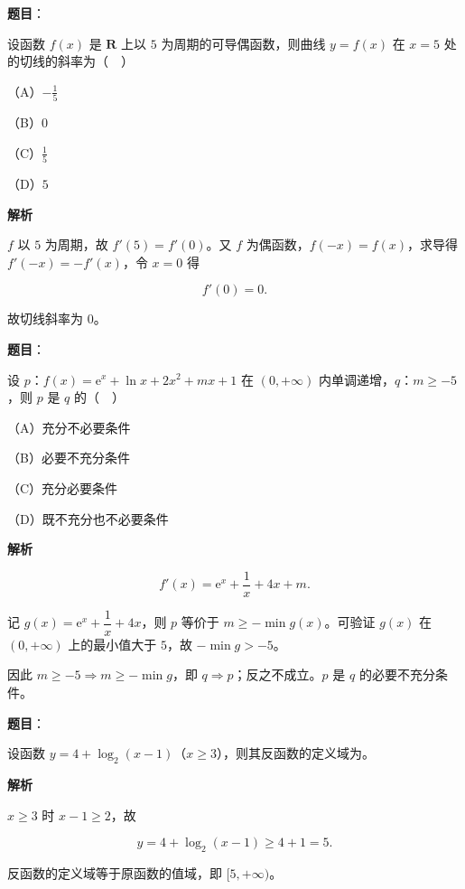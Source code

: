 \begin{answer}

\textbf{题目}：

设函数 $f(x)$ 是 $\mathbf R$ 上以 $5$ 为周期的可导偶函数，则曲线 $y=f(x)$ 在 $x=5$ 处的切线的斜率为（　）

（A）$-\frac15$

（B）$0$

（C）$\frac15$

（D）$5$

\textbf{解析}

$f$ 以 $5$ 为周期，故 $f'(5)=f'(0)$。又 $f$ 为偶函数，$f(-x)=f(x)$，求导得 $f'(-x)=-f'(x)$，令 $x=0$ 得

\nopagebreak[4]
\[f'(0)=0.\]

故切线斜率为 $0$。


\end{answer}
\begin{answer}

\textbf{题目}：

设 $p$：$f(x)=\mathrm e^x+\ln x+2x^2+mx+1$ 在 $(0,+\infty)$ 内单调递增，$q$：$m\geqslant-5$，则 $p$ 是 $q$ 的（　）

（A）充分不必要条件

（B）必要不充分条件

（C）充分必要条件

（D）既不充分也不必要条件

\textbf{解析}

\nopagebreak[4]
\[f'(x)=\mathrm e^x+\frac1x+4x+m.\]

记 $g(x)=\mathrm e^x+\dfrac1x+4x$，则 $p$ 等价于 $m\geqslant-\min g(x)$。可验证 $g(x)$ 在 $(0,+\infty)$ 上的最小值大于 $5$，故 $-\min g>-5$。

因此 $m\geqslant-5\Rightarrow m\geqslant-\min g$，即 $q\Rightarrow p$；反之不成立。$p$ 是 $q$ 的必要不充分条件。


\end{answer}
\begin{answer}

\textbf{题目}：

设函数 $y=4+\log_2(x-1)$（$x\geqslant3$），则其反函数的定义域为\gkblank{}。

\textbf{解析}

$x\geqslant3$ 时 $x-1\geqslant2$，故

\nopagebreak[4]
\[y=4+\log_2(x-1)\geqslant4+1=5.\]

反函数的定义域等于原函数的值域，即 $[5,+\infty)$。

\gkanswer{答案：$[5,+\infty)$。}

\end{answer}
